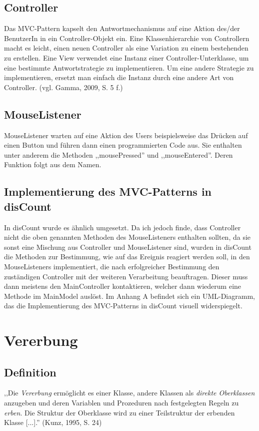 \documentclass[12pt]{report}
\begin{document}
\subsection{Controller}
Das MVC-Pattern kapselt den Antwortmechanismus auf eine Aktion des/der BenutzerIn in ein Controller-Objekt ein. Eine Klassenhierarchie von Controllern macht es leicht, einen neuen Controller als eine Variation zu einem bestehenden zu erstellen.
\noindent Eine View verwendet eine Instanz einer Controller-Unterklasse, um eine bestimmte Antwortstrategie zu implementieren. Um eine andere Strategie zu implementieren, ersetzt man einfach die Instanz durch eine andere Art von Controller. (vgl. Gamma, 2009, S. 5 f.\nocite{DPGOF})\\

\subsection{MouseListener}
MouseListener warten auf eine Aktion des Users beispielsweise das Drücken auf einen Button und führen dann einen programmierten Code aus. Sie enthalten unter anderem die Methoden ,,mousePressed'' und ,,mouseEntered''. Deren Funktion folgt aus dem Namen.

\subsection{Implementierung des MVC-Patterns in disCount}
In disCount wurde es ähnlich umgesetzt. Da ich jedoch finde, dass Controller nicht die oben genannten Methoden des MouseListeners enthalten sollten, da sie sonst eine Mischung aus Controller und MouseListener sind, wurden in disCount die Methoden zur Bestimmung, wie auf das Ereignis reagiert werden soll, in den MouseListeners implementiert, die nach erfolgreicher Bestimmung den zuständigen Controller mit der weiteren Verarbeitung beauftragen. Dieser muss dann meistens den MainController kontaktieren, welcher dann wiederum eine Methode im MainModel auslöst. Im Anhang A befindet sich ein UML-Diagramm, das die Implementierung des MVC-Patterns in disCount visuell widerspiegelt.



\section{Vererbung} 
  
\subsection{Definition}
,,Die \textit{Vererbung} ermöglicht es einer Klasse, andere Klassen als  \textit{direkte Oberklassen} anzugeben und deren Variablen und Prozeduren nach festgelegten Regeln zu  \textit{erben}. Die Struktur der Oberklasse wird zu einer Teilstruktur der erbenden Klasse [...].'' (Kunz, 1995,  S. 24\nocite{Vererbung})
\end{document}
